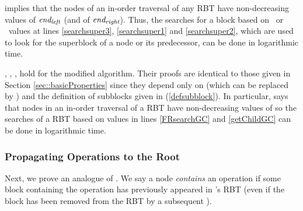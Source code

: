  implies that 
the nodes of an in-order traversal of any RBT have non-decreasing values of
$\mbox{\textit{end\textsubscript{left}}}$ (and of $\mbox{\textit{end\textsubscript{right}}}$).
Thus, the searches for a block based on \eleft\ or \eright\ values 
at lines \ref{searchsuper3}, \ref{searchsuper1} and \ref{searchsuper2},
which are used to look for the superblock of a node or its predecessor, can be done in logarithmic time.

, , ,  
hold for the modified algorithm.  Their proofs are identical to those given in 
Section \ref{sec::basicProperties} since they  depend only on  (which can be replaced by )
and the definition of subblocks given in (\ref{defsubblock}).
In particular,  says that nodes in an in-order traversal of a RBT have non-decreasing
values of   so the searches of a RBT based on
 values in lines
\ref{FRsearchGC} and \ref{getChildGC} can be done in logarithmic time.

\subsubsection{Propagating Operations to the Root}

Next, we prove an analogue of .
We say a node  \emph{contains} an operation
if some block containing the operation has previously appeared in 's RBT (even if 
the block has been removed from the RBT by a subsequent ).

